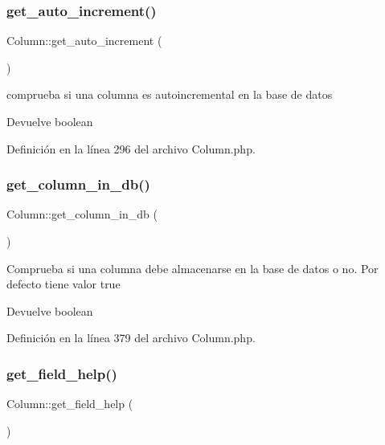 \subsubsection{\texorpdfstring{get\_auto\_increment()}{get\_auto\_increment()}}
{\footnotesize\ttfamily Column\+::get\+\_\+auto\+\_\+increment (\begin{DoxyParamCaption}{ }\end{DoxyParamCaption})}

comprueba si una columna es autoincremental en la base de datos

\begin{DoxyReturn}{Devuelve}
boolean 
\end{DoxyReturn}


Definición en la línea 296 del archivo Column.\+php.

\mbox{\label{class_column_ac730ad2d5ffed1e805200bf0cdc15064}} 
\subsubsection{\texorpdfstring{get\_column\_in\_db()}{get\_column\_in\_db()}}
{\footnotesize\ttfamily Column\+::get\+\_\+column\+\_\+in\+\_\+db (\begin{DoxyParamCaption}{ }\end{DoxyParamCaption})}

Comprueba si una columna debe almacenarse en la base de datos o no. Por defecto tiene valor true

\begin{DoxyReturn}{Devuelve}
boolean 
\end{DoxyReturn}


Definición en la línea 379 del archivo Column.\+php.

\mbox{\label{class_column_a1fe455614c5937aec57db013d23df078}} 
\subsubsection{\texorpdfstring{get\_field\_help()}{get\_field\_help()}}
{\footnotesize\ttfamily Column\+::get\+\_\+field\+\_\+help (\begin{DoxyParamCaption}{ }\end{DoxyParamCaption})}

